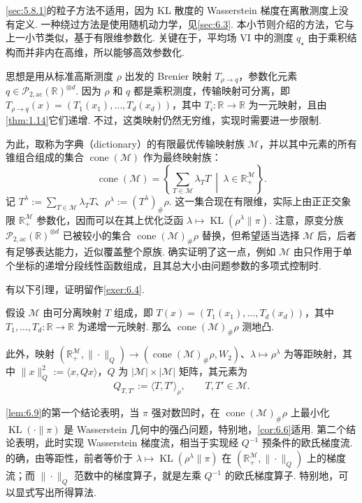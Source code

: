\autoref{sec:5.8.1}的粒子方法不适用，因为 KL 散度的 Wasserstein 梯度在离散测度上没有定义. 一种绕过方法是使用随机动力学，见\autoref{sec:6.3}. 本小节则介绍\cite{ref169}的方法，它与上一小节类似，基于有限维参数化. 关键在于，平均场 VI 中的测度 $q_\star$ 由于乘积结构而并非内在高维，所以能够高效参数化.

思想是用从标准高斯测度 $\rho$ 出发的 Brenier 映射 $T_{\rho\to q}$，参数化元素 $q\in\mathcal P_{2,\mathrm{ac}}(\mathbb R)^{\otimes d}$. 因为 $\rho$ 和 $q$ 都是乘积测度，传输映射可分离，即 $T_{\rho\to q}(x)=(T_1(x_1),\ldots,T_d(x_d))$，其中 $T_i:\mathbb R\to\mathbb R$ 为一元映射，且由\autoref{thm:1.14}它们递增. 不过，这类映射仍然无穷维，实现时需要进一步限制.

为此，取称为字典（dictionary）的有限最优传输映射族 $\mathcal M$，并以其中元素的所有锥组合组成的集合 $\operatorname{cone}(\mathcal M)$ 作为最终映射族：
$$
\operatorname{cone}(\mathcal M)=\left\{\sum_{T\in\mathcal M}\lambda_TT\ \middle|\ \lambda\in\mathbb R_+^{\mathcal M}\right\}.
$$
记 $T^\lambda:=\sum_{T\in\mathcal M}\lambda_TT$、$\rho^\lambda:=(T^\lambda)_\#\rho$. 这一集合现在有限维，实际上由正正交象限 $\mathbb R_+^{\mathcal M}$ 参数化，因而可以在其上优化泛函 $\lambda\mapsto\operatorname{KL}(\rho^\lambda\|\pi)$. 注意，原变分族 $\mathcal P_{2,\mathrm{ac}}(\mathbb R)^{\otimes d}$ 已被较小的集合 $\operatorname{cone}(\mathcal M)_\#\rho$ 替换，但希望适当选择 $\mathcal M$ 后，后者有足够表达能力，近似覆盖整个原族. \cite{ref169}确实证明了这一点，例如 $\mathcal M$ 由只作用于单个坐标的递增分段线性函数组成，且其总大小由问题参数的多项式控制时.

有以下引理，证明留作\autoref{exer:6.4}.

\begin{lemma}\label{lem:6.9}
假设 $\mathcal M$ 由可分离映射 $T$ 组成，即 $T(x)=(T_1(x_1),\ldots,T_d(x_d))$，其中 $T_1,\ldots,T_d:\mathbb R\to\mathbb R$ 为递增一元映射. 那么 $\operatorname{cone}(\mathcal M)_\#\rho$ 测地凸.

此外，映射 $(\mathbb R_+^{\mathcal M},\|\cdot\|_Q)\to(\operatorname{cone}(\mathcal M)_\#\rho,W_2)$、$\lambda\mapsto\rho^\lambda$ 为等距映射，其中 $\|x\|_Q^2:=\langle x,Qx\rangle$，$Q$ 为 $|\mathcal M|\times|\mathcal M|$ 矩阵，其元素为
\begin{equation}\label{eq:6.5}
Q_{T,T'}:=\langle T,T'\rangle_\rho,\qquad T,T'\in\mathcal M.
\end{equation}
\end{lemma}

\autoref{lem:6.9}的第一个结论表明，当 $\pi$ 强对数凹时，在 $\operatorname{cone}(\mathcal M)_\#\rho$ 上最小化 $\operatorname{KL}(\cdot\|\pi)$ 是 Wasserstein 几何中的强凸问题，特别地，\autoref{cor:6.6}适用. 第二个结论表明，此时实现 Wasserstein 梯度流，相当于实现经 $Q^{-1}$ 预条件的欧氏梯度流. 的确，由等距性，前者等价于 $\lambda\mapsto\operatorname{KL}(\rho^\lambda\|\pi)$ 在 $(\mathbb R_+^{\mathcal M},\|\cdot\|_Q)$ 上的梯度流；而 $\|\cdot\|_Q$ 范数中的梯度算子，就是左乘 $Q^{-1}$ 的欧氏梯度算子. 特别地，可以显式写出所得算法.

